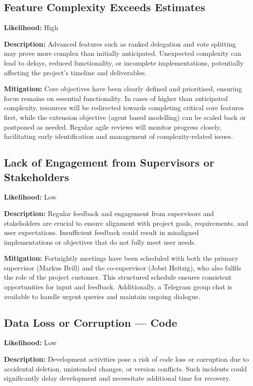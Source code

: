 \subsection*{Feature Complexity Exceeds Estimates}

\textbf{Likelihood:} High

\textbf{Description:} Advanced features such as ranked delegation and vote splitting may prove more complex than initially anticipated. Unexpected complexity can lead to delays, reduced functionality, or incomplete implementations, potentially affecting the project's timeline and deliverables.

\textbf{Mitigation:} Core objectives have been clearly defined and prioritised, ensuring focus remains on essential functionality. In cases of higher than anticipated complexity, resources will be redirected towards completing critical core features first, while the extension objective (agent based modelling) can be scaled back or postponed as needed. Regular agile reviews will monitor progress closely, facilitating early identification and management of complexity-related issues.

\subsection*{Lack of Engagement from Supervisors or Stakeholders}

\textbf{Likelihood:} Low

\textbf{Description:} Regular feedback and engagement from supervisors and stakeholders are crucial to ensure alignment with project goals, requirements, and user expectations. Insufficient feedback could result in misaligned implementations or objectives that do not fully meet user needs.

\textbf{Mitigation:} Fortnightly meetings have been scheduled with both the primary supervisor (Markus Brill) and the co-supervisor (Jobst Heitzig), who also fulfils the role of the project customer. This structured schedule ensures consistent opportunities for input and feedback. Additionally, a Telegram group chat is available to handle urgent queries and maintain ongoing dialogue.

\subsection*{Data Loss or Corruption --- Code}

\textbf{Likelihood:} Low

\textbf{Description:} Development activities pose a risk of code loss or corruption due to accidental deletion, unintended changes, or version conflicts. Such incidents could significantly delay development and necessitate additional time for recovery.

